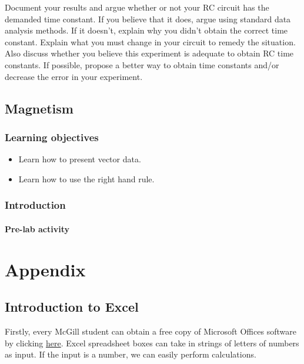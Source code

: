 \documentclass[12pt]{report}
\begin{document}
Document your results and argue whether or not your RC circuit has the demanded time constant. If you believe that it does, argue using standard data analysis methods. If it doesn't, explain why you didn't obtain the correct time constant. Explain what you must change in your circuit to remedy the situation. Also discuss whether you believe this experiment is adequate to obtain RC time constants. If possible, propose a better way to obtain time constants and/or decrease the error in your experiment.

\chapter{Magnetism}
\section{Learning objectives}
\begin{itemize}
\item Learn how to present vector data.
\item Learn how to use the right hand rule.
\end{itemize}
\section{Introduction}
\subsection{Pre-lab activity}

{}
\part*{Appendix} \label{Part:Appendix}

{}
\chapter*{Introduction to Excel}

Firstly, every McGill student can obtain a free copy of Microsoft Offices software by clicking \href{http://kb.mcgill.ca/kb/article?ArticleId=5172&source=Article&c=12&cid=2}{here}. Excel spreadsheet boxes can take in strings of letters of numbers as input. If the input is a number, we can easily perform calculations.\\
\end{document}
